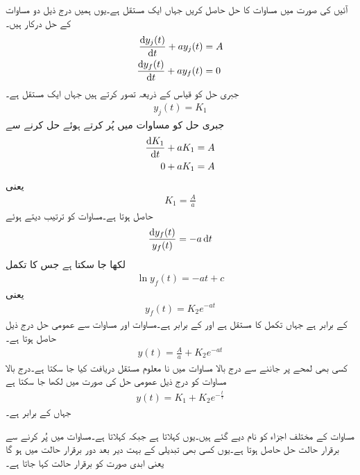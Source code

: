 آئیں  کی صورت میں مساوات  کا حل حاصل کریں جہاں  ایک مستقل ہے۔یوں ہمیں درج ذیل دو مساوات کے حل درکار ہیں۔
\begin{align}
\frac{\dif y_j(t)}{\dif t}+a y_j(t)&=A \label{مساوات_عارضی_یک_درجی_عمومی_مساوات_پ}\\
\frac{\dif y_f(t)}{\dif t}+a y_f(t)&=0\label{مساوات_عارضی_یک_درجی_عمومی_مساوات_ت}
\end{align}
جبری حل کو قیاس کے ذریعہ  تصور کرتے ہیں جہاں  ایک مستقل ہے۔
\begin{align}
y_j(t)=K_1
\end{align}
جبری حل  کو مساوات  میں پُر کرتے ہوئے حل کرنے سے
\begin{align*}
\frac{\dif K_1}{\dif t}+a K_1&=A \\
0+a K_1&=A
\end{align*}
یعنی
\begin{align}\label{مساوات_عارضی_یک_درجی_عمومی_مساوات_ٹ}
K_1=\frac{A}{a}
\end{align}
حاصل ہوتا ہے۔مساوات  کو ترتیب دیتے ہوئے
\begin{align*}
\frac{\dif y_f(t)}{y_f(t)}=-a \dif t
\end{align*}
لکھا جا سکتا ہے  جس کا تکمل
\begin{align*}
\ln y_f(t)=-a t +c
\end{align*}
یعنی
\begin{align}\label{مساوات_عارضی_یک_درجی_عمومی_مساوات_ث}
y_f(t)=K_2e^{-at}
\end{align}
کے برابر ہے جہاں  تکمل کا مستقل ہے اور  کے برابر ہے۔مساوات  اور مساوات  سے عمومی حل درج ذیل حاصل ہوتا ہے۔
\begin{align}
y(t)=\frac{A}{a}+K_2 e^{-at}
\end{align}
کسی بھی لمحے پر  جاننے سے درج بالا مساوات میں نا معلوم مستقل  دریافت کیا جا سکتا ہے۔درج بالا مساوات کو درج ذیل عمومی حل کی صورت میں لکھا جا سکتا ہے
\begin{align}\label{مساوات_عارضی_یک_درجی_عمومی_مساوات_ج}
y(t)=K_1+K_2 e^{-\frac{t}{\tau}}
\end{align}
جہاں  کے برابر ہے۔


مساوات  کے مختلف اجزاء کو نام دیے گئے ہیں۔یوں   کہلاتا ہے جبکہ   کہلاتا ہے۔مساوات  میں  پُر کرنے سے برقرار حالت حل حاصل ہوتا ہے۔یوں کسی بھی تبدیلی کے بہت دیر بعد دور برقرار حالت میں ہو گا یعنی ابدی صورت کو برقرار حالت کہا جاتا ہے۔

